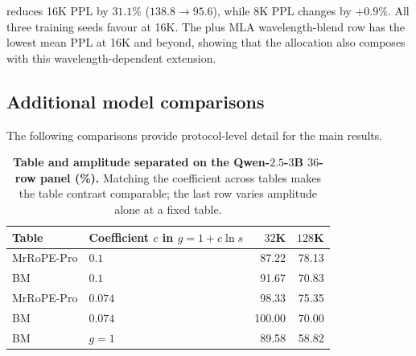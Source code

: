 \begin{table}[ht]
\caption{MLA validation (432M, $d_{\mathrm{rope}}{=}32$, 3-seed mean
$\pm$ std). Rows marked ``MLA wavelength-blend'' use this run's wavelength-blend
operator defined above.}
\label{tab:mla}
\centering
\small
{}
\end{table}

\evq{} reduces 16K PPL by $31.1\%$ ($138.8\to95.6$), while 8K PPL changes by
$+0.9\%$. All three training seeds favour \evq{} at 16K. The \evq{} plus MLA wavelength-blend
row has the lowest mean PPL at 16K and beyond, showing that the allocation
also composes with this wavelength-dependent extension.

\FloatBarrier


\subsection{Additional model comparisons}
\label{sec:relocated-floats}
The following comparisons provide protocol-level detail for the main results.

\begin{table}[htbp]
\centering
\small
\setlength{\tabcolsep}{5pt}
\caption{\textbf{Table and amplitude separated on the Qwen-$2.5$-$3$B $36$-row panel (\%).}
Matching the coefficient across tables makes the table contrast comparable; the
last row varies amplitude alone at a fixed table.}
\label{tab:gain-factorial}
\begin{tabular}{@{}llrr@{}}
\toprule
Table & Coefficient $c$ in $g=1+c\ln s$ & $32$K & $128$K \\
\midrule
MrRoPE-Pro & $0.1$   & 87.22 & 78.13 \\
BM         & $0.1$   & 91.67 & 70.83 \\
MrRoPE-Pro & $0.074$ & 98.33 & 75.35 \\
BM         & $0.074$ & 100.00 & 70.00 \\
BM         & $g=1$   & 89.58 & 58.82 \\
\bottomrule
\end{tabular}
\end{table}

